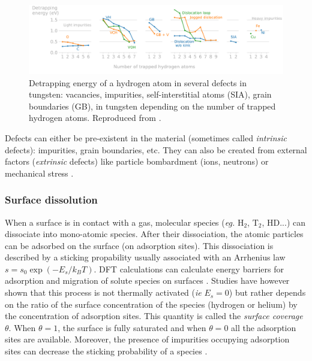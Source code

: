 \begin{figure}
    \centering
    \includegraphics[width=\linewidth]{Figures/Chapter1/trapping_energy_hydrogen_in_tungsten.pdf}
    \caption{Detrapping energy of a hydrogen atom in several defects in tungsten: vacancies, impurities, self-interstitial atoms (SIA), grain boundaries (GB), in tungsten depending on the number of trapped hydrogen atoms. Reproduced from \cite{hodille_study_2016}.}
\end{figure}

Defects can either be pre-existent in the material (sometimes called \textit{intrinsic} defects): impurities, grain boundaries, etc.
They can also be created from external factors (\textit{extrinsic} defects) like particle bombardment (ions, neutrons)  or mechanical stress .

\subsubsection{Surface dissolution}

When a surface is in contact with a gas, molecular species (\textit{eg.} $\text{H}_2$, $\text{T}_2$, $\text{HD}$...) can dissociate into mono-atomic species.
After their dissociation, the atomic particles can be adsorbed on the surface (on adsorption sites).
This dissociation is described by a sticking propability usually associated with an Arrhenius law $s = s_0 \exp{(-E_s/k_B T)}$.
DFT calculations can calculate energy barriers for adsorption and migration of solute species on surfaces .
Studies have however shown that this process is not thermally activated (\textit{ie} $E_s=0$)  but rather depends on the ratio of the surface concentration of the species (hydrogen or helium) by the concentration of adsorption sites.
This quantity is called the \textit{surface coverage} $\theta$. 
When $\theta = 1$, the surface is fully saturated and when $\theta = 0$ all the adsorption sites are available.
Moreover, the presence of impurities occupying adsorption sites can decrease the sticking probability of a species .

